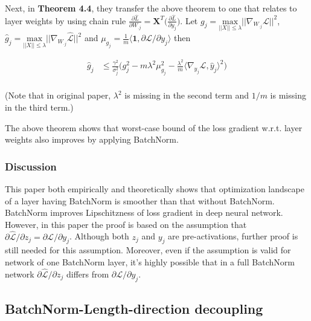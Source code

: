 \documentclass{article}
\begin{document}
Next, in \textbf{Theorem 4.4}, they transfer the above theorem to one that relates to layer weights by using chain rule $\frac{\partial\hat{L}}{\partial W_{.j}}=\textbf{X}^T\big(\frac{\partial\hat{L}}{\partial y_{j}}\big)$. Let $g_j=\underset{||X||\leq\lambda}{\mathrm{max}}\big|\big|\nabla_{W_{\cdot j}}\mathcal{L}\big|\big|^2$, $\hat{g}_j=\underset{||X||\leq\lambda}{\mathrm{max}}\big|\big|\nabla_{W_{\cdot j}}\hat{\mathcal{L}}\big|\big|^2$ and $\mu_{g_j}=\frac{1}{m}\langle\mathbf{1},\partial\mathcal{L}/\partial y_j\rangle$ then

\begin{align*}
	\hat{g}_j &\leq 
	\frac{\gamma^2}{\sigma_j^2}\Bigg(
	g_j^2 - m\lambda^2\mu^2_{g_j}-\frac{\lambda^2}{m}\langle\nabla_{y_j}\mathcal{L},\hat{y}_j\rangle^2
	\Bigg)\\
\end{align*}

(Note that in original paper, $\lambda^2$ is missing in the second term and $1/m$ is missing in the third term.)

The above theorem shows that worst-case bound of the loss gradient w.r.t. layer weights also improves by applying BatchNorm.

\subsubsection{Discussion}

This paper both empirically and theoretically shows that optimization landscape of a layer having BatchNorm is smoother than that without BatchNorm. BatchNorm improves Lipschitzness of loss gradient in deep neural network. However, in this paper the proof is based on the assumption that $\partial\hat{\mathcal{L}}/\partial z_j = \partial\mathcal{L}/\partial y_j$. Although both $z_j$ and $y_j$ are pre-activations, further proof is still needed for this assumption. Moreover, even if the assumption is valid for network of one BatchNorm layer, it's highly possible that in a full BatchNorm network $\partial\hat{\mathcal{L}}/\partial z_j$ differs from  $\partial\mathcal{L}/\partial y_j$.


\subsection{BatchNorm-Length-direction decoupling}
\end{document}
